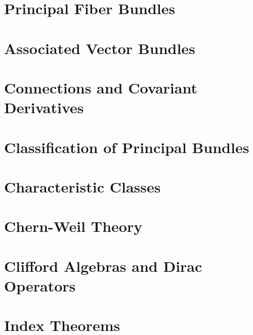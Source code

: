 \documentclass[english,letterpaper]{article}%
\numberwithin{equation}{section}
\numberwithin{figure}{section}
\numberwithin{table}{section}
\theoremstyle{definition}
\theoremstyle{definition}
\theoremstyle{definition}
\theoremstyle{plain}
\theoremstyle{plain}
\theoremstyle{plain}
\theoremstyle{plain}
\theoremstyle{remark}
\theoremstyle{remark}
\begin{document}
\section{Principal Fiber Bundles}
\section{Associated Vector Bundles}
\section{Connections and Covariant Derivatives}
\section{Classification of Principal Bundles}
\section{Characteristic Classes}
\section{Chern-Weil Theory}
\section{Clifford Algebras and Dirac Operators}
\section{Index Theorems}
\end{document}
